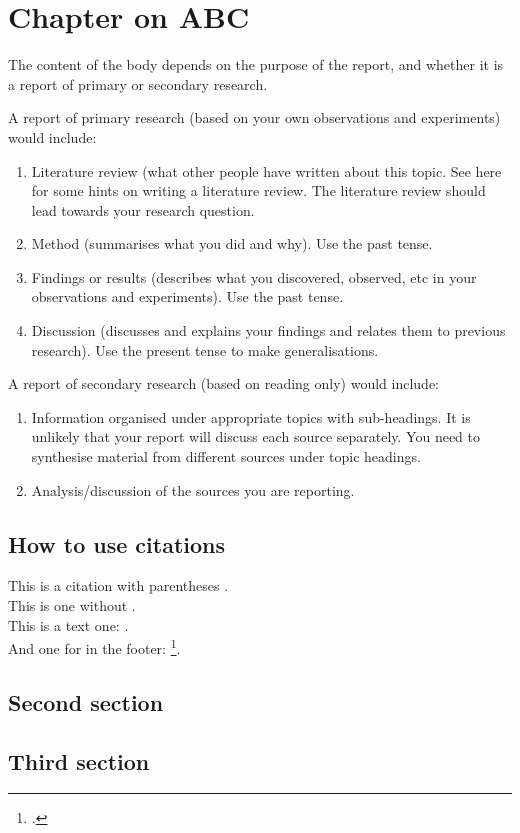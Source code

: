\chapter{Chapter on ABC}
The content of the body depends on the purpose of the report, and whether it is a report of primary or secondary research.

A report of primary research (based on your own observations and experiments) would include:
\begin{enumerate}
\item
Literature review (what other people have written about this topic. See here for some hints on writing a literature review. The literature review should lead towards your research question.
\item
Method (summarises what you did and why). Use the past tense.
\item
Findings or results (describes what you discovered, observed, etc in your observations and experiments). Use the past tense.
\item
Discussion (discusses and explains your findings and relates them to previous research). Use the present tense to make generalisations.
\end{enumerate}
A report of secondary research (based on reading only) would include:
\begin{enumerate}
\item
Information organised under appropriate topics with sub-headings. It is unlikely that your report will discuss each source separately. You need to synthesise material from different sources under topic headings.
\item
Analysis/discussion of the sources you are reporting.
\end{enumerate}
\section{How to use citations}

This is a citation with parentheses \parencite{RN4}.\\

This is one without \cite[prenote][postnote]{RN4}.\\

This is a text one: \textcite{RN4}.\\

And one for in the footer: \footcite[prenote][postnote]{RN4}. 
 
\section{Second section}
\section{Third section}